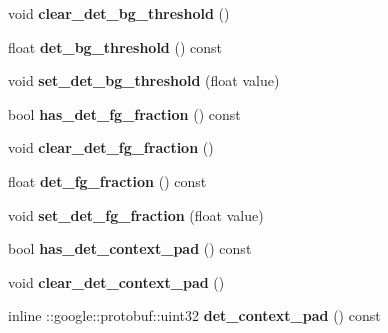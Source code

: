 \begin{DoxyCompactItemize}
void {\bfseries clear\+\_\+det\+\_\+bg\+\_\+threshold} ()
\item 
\mbox{\label{classcaffe_1_1_v0_layer_parameter_aae2174ade5532ea7a3d94f4902b1fc85}} 
float {\bfseries det\+\_\+bg\+\_\+threshold} () const
\item 
\mbox{\label{classcaffe_1_1_v0_layer_parameter_ad62a54eccebbb15747e5a91ce52a74c9}} 
void {\bfseries set\+\_\+det\+\_\+bg\+\_\+threshold} (float value)
\item 
\mbox{\label{classcaffe_1_1_v0_layer_parameter_a7a39abf25dd478de95bc3f83ba07fb55}} 
bool {\bfseries has\+\_\+det\+\_\+fg\+\_\+fraction} () const
\item 
\mbox{\label{classcaffe_1_1_v0_layer_parameter_acf985dc920df16e042de52359a3eddc5}} 
void {\bfseries clear\+\_\+det\+\_\+fg\+\_\+fraction} ()
\item 
\mbox{\label{classcaffe_1_1_v0_layer_parameter_a78fa39d7e635aa29fcfb57847a957e40}} 
float {\bfseries det\+\_\+fg\+\_\+fraction} () const
\item 
\mbox{\label{classcaffe_1_1_v0_layer_parameter_a46b6b8a69292b526f625100d2365a44c}} 
void {\bfseries set\+\_\+det\+\_\+fg\+\_\+fraction} (float value)
\item 
\mbox{\label{classcaffe_1_1_v0_layer_parameter_a9da899ace2a6c3f5808fa8cb7b20bea8}} 
bool {\bfseries has\+\_\+det\+\_\+context\+\_\+pad} () const
\item 
\mbox{\label{classcaffe_1_1_v0_layer_parameter_a492c147c0993b444a1035b1144b9cd8c}} 
void {\bfseries clear\+\_\+det\+\_\+context\+\_\+pad} ()
\item 
\mbox{\label{classcaffe_1_1_v0_layer_parameter_a0240d477c41481a6cf98aa42101f0746}} 
inline \+::google\+::protobuf\+::uint32 {\bfseries det\+\_\+context\+\_\+pad} () const
\item 
\mbox{\label{classcaffe_1_1_v0_layer_parameter_ae96003a58cd160265992e56ebc549ba9}} 

\end{DoxyCompactItemize}
